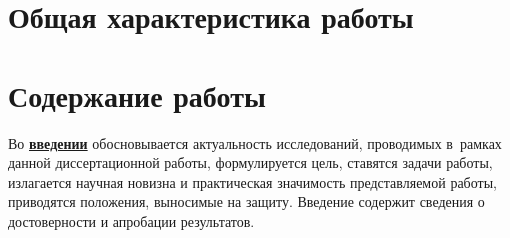 \section*{Общая характеристика работы}

\newcommand{\actuality}{\pdfbookmark[1]{Актуальность}{actuality}\underline{\textbf{\actualityTXT}}}
\newcommand{\progress}{\pdfbookmark[1]{Разработанность темы}{progress}\underline{\textbf{\progressTXT}}}
\newcommand{\aim}{\pdfbookmark[1]{Цели}{aim}\underline{{\textbf\aimTXT}}}
\newcommand{\tasks}{\pdfbookmark[1]{Задачи}{tasks}\underline{\textbf{\tasksTXT}}}
\newcommand{\aimtasks}{\pdfbookmark[1]{Цели и задачи}{aimtasks}\aimtasksTXT}
\newcommand{\novelty}{\pdfbookmark[1]{Научная новизна}{novelty}\underline{\textbf{\noveltyTXT}}}
\newcommand{\influence}{\pdfbookmark[1]{Практическая значимость}{influence}\underline{\textbf{\influenceTXT}}}
\newcommand{\methods}{\pdfbookmark[1]{Методология и методы исследования}{methods}\underline{\textbf{\methodsTXT}}}
\newcommand{\defpositions}{\pdfbookmark[1]{Положения, выносимые на защиту}{defpositions}\underline{\textbf{\defpositionsTXT}}}
\newcommand{\reliability}{\pdfbookmark[1]{Достоверность}{reliability}\underline{\textbf{\reliabilityTXT}}}
\newcommand{\probation}{\pdfbookmark[1]{Апробация}{probation}\underline{\textbf{\probationTXT}}}
\newcommand{\contribution}{\pdfbookmark[1]{Личный вклад}{contribution}\underline{\textbf{\contributionTXT}}}
\newcommand{\publications}{\pdfbookmark[1]{Публикации}{publications}\underline{\textbf{\publicationsTXT}}}




\section*{Содержание работы}
Во \underline{\textbf{введении}} обосновывается актуальность исследований, проводимых в~рамках данной диссертационной работы, формулируется цель, ставятся задачи работы, излагается научная новизна
и практическая значимость представляемой работы, приводятся положения, выносимые на защиту. 
Введение содержит сведения о достоверности и апробации результатов.



